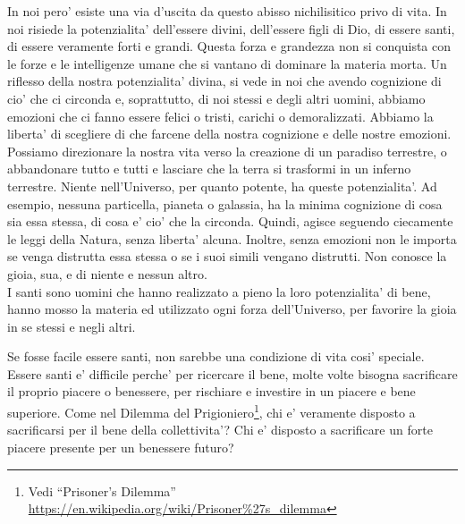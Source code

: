 In noi pero' esiste una via d'uscita da questo abisso nichilisitico privo di vita. In noi risiede la potenzialita' dell'essere divini, dell'essere figli di Dio, di essere santi, di essere veramente forti e grandi. Questa forza e grandezza non si conquista con le forze e le intelligenze umane che si vantano di dominare la materia morta.
Un riflesso della nostra potenzialita' divina, si vede in noi che avendo cognizione di cio' che ci circonda e, soprattutto, di noi stessi e degli altri uomini, abbiamo emozioni che ci fanno essere felici o tristi, carichi o demoralizzati. Abbiamo la liberta' di scegliere di che farcene della nostra cognizione e delle nostre emozioni. Possiamo direzionare la nostra vita verso la creazione di un paradiso terrestre, o abbandonare tutto e tutti e lasciare che la terra si trasformi in un inferno terrestre. Niente nell'Universo, per quanto potente, ha queste potenzialita'. Ad esempio, nessuna particella, pianeta o galassia, ha la minima cognizione di cosa sia essa stessa, di cosa e' cio' che la circonda. Quindi, agisce seguendo ciecamente le leggi della Natura, senza liberta' alcuna. Inoltre, senza emozioni non le importa se venga distrutta essa stessa o se i suoi simili vengano distrutti. Non conosce la gioia, sua, e di niente e nessun altro. \\
I santi sono uomini che hanno realizzato a pieno la loro potenzialita' di bene, hanno mosso la materia ed utilizzato ogni forza dell'Universo, per favorire la gioia in se stessi e negli altri.

Se fosse facile essere santi, non sarebbe una condizione di vita cosi' speciale. Essere santi e' difficile perche' per ricercare il bene, molte volte bisogna sacrificare il proprio piacere o benessere, per rischiare e investire in un piacere e bene superiore. Come nel Dilemma del Prigioniero\footnote{Vedi ``Prisoner's Dilemma'' \url{https://en.wikipedia.org/wiki/Prisoner\%27s\_dilemma}}, chi e' veramente disposto a sacrificarsi per il bene della collettivita'? Chi e' disposto a sacrificare un forte piacere presente per un benessere futuro?

